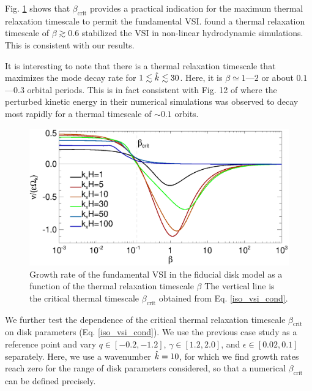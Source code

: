 Fig. \ref{bcrit_compare1} shows that $\beta_\mathrm{crit}$ provides a  
practical indication for the maximum thermal relaxation timescale to
permit the fundamental VSI. %
\cite{nelson13} found a thermal relaxation timescale of $\beta\gtrsim
0.6$ stabilized the VSI in non-linear hydrodynamic simulations. This 
is consistent with our results.   

It is interesting to note that there is a thermal relaxation timescale that
maximizes the mode decay rate for $1\lesssim \hat{k} \lesssim 30$. Here,
it is $\beta\simeq1$---$2$ or about $0.1$---$0.3$ orbital
periods. This is in fact consistent with Fig. 12 of \cite{nelson13}
where the perturbed kinetic energy in their numerical simulations was
observed to decay most rapidly for a thermal timescale of $\sim 0.1$
orbits.     


\begin{figure}
   \includegraphics[width=\linewidth]{figures/gcorr_compare2} 
   \caption{Growth rate of the fundamental VSI in the fiducial disk
     model as a function of the thermal relaxation timescale $\beta$
     The vertical line
     is the critical thermal timescale $\beta_\mathrm{crit}$  obtained
     from Eq. \ref{iso_vsi_cond}. 
     \label{bcrit_compare1}}   
 \end{figure} 


We further test the dependence of the critical thermal relaxation timescale 
$\beta_\mathrm{crit}$ on disk parameters
(Eq. \ref{iso_vsi_cond}).  We use the previous case study as a
reference point and vary $q\in[-0.2,-1.2]$, 
$\gamma\in[1.2,2.0]$, and $\epsilon\in[0.02,0.1]$
separately. Here, we use a wavenumber $\hat{k}=10$, for which we
find growth rates reach zero for the range of disk parameters
considered, so that a numerical $\beta_\mathrm{crit}$ can be defined precisely. 

